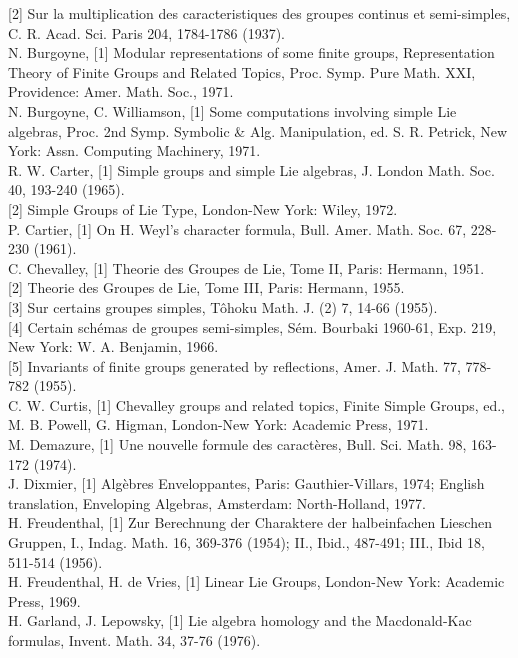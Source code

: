 \documentclass[10pt]{article}
\begin{document}
[2] Sur la multiplication des caracteristiques des groupes continus et semi-simples, C. R. Acad. Sci. Paris 204, 1784-1786 (1937).\\[0pt]
N. Burgoyne, [1] Modular representations of some finite groups, Representation Theory of Finite Groups and Related Topics, Proc. Symp. Pure Math. XXI, Providence: Amer. Math. Soc., 1971.\\[0pt]
N. Burgoyne, C. Williamson, [1] Some computations involving simple Lie algebras, Proc. 2nd Symp. Symbolic \& Alg. Manipulation, ed. S. R. Petrick, New York: Assn. Computing Machinery, 1971.\\[0pt]
R. W. Carter, [1] Simple groups and simple Lie algebras, J. London Math. Soc. 40, 193-240 (1965).\\[0pt]
[2] Simple Groups of Lie Type, London-New York: Wiley, 1972.\\[0pt]
P. Cartier, [1] On H. Weyl's character formula, Bull. Amer. Math. Soc. 67, 228-230 (1961).\\[0pt]
C. Chevalley, [1] Theorie des Groupes de Lie, Tome II, Paris: Hermann, 1951.\\[0pt]
[2] Theorie des Groupes de Lie, Tome III, Paris: Hermann, 1955.\\[0pt]
[3] Sur certains groupes simples, Tôhoku Math. J. (2) 7, 14-66 (1955).\\[0pt]
[4] Certain schémas de groupes semi-simples, Sém. Bourbaki 1960-61, Exp. 219, New York: W. A. Benjamin, 1966.\\[0pt]
[5] Invariants of finite groups generated by reflections, Amer. J. Math. 77, 778-782 (1955).\\[0pt]
C. W. Curtis, [1] Chevalley groups and related topics, Finite Simple Groups, ed., M. B. Powell, G. Higman, London-New York: Academic Press, 1971.\\[0pt]
M. Demazure, [1] Une nouvelle formule des caractères, Bull. Sci. Math. 98, 163-172 (1974).\\[0pt]
J. Dixmier, [1] Algèbres Enveloppantes, Paris: Gauthier-Villars, 1974; English translation, Enveloping Algebras, Amsterdam: North-Holland, 1977.\\[0pt]
H. Freudenthal, [1] Zur Berechnung der Charaktere der halbeinfachen Lieschen Gruppen, I., Indag. Math. 16, 369-376 (1954); II., Ibid., 487-491; III., Ibid 18, 511-514 (1956).\\[0pt]
H. Freudenthal, H. de Vries, [1] Linear Lie Groups, London-New York: Academic Press, 1969.\\[0pt]
H. Garland, J. Lepowsky, [1] Lie algebra homology and the Macdonald-Kac formulas, Invent. Math. 34, 37-76 (1976).\\[0pt]
\end{document}
